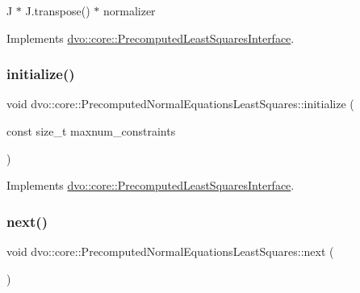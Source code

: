 J\textquotesingle{} $\ast$ J\textquotesingle{}.transpose() $\ast$ normalizer

Implements \mbox{\hyperlink{classdvo_1_1core_1_1_precomputed_least_squares_interface_a9b879b6600b82a8b989770bf27dad7bc}{dvo\+::core\+::\+Precomputed\+Least\+Squares\+Interface}}.

\mbox{\label{classdvo_1_1core_1_1_precomputed_normal_equations_least_squares_a51e5717e0add36b37db3617d35c87c87}} 
\subsubsection{\texorpdfstring{initialize()}{initialize()}}
{\footnotesize\ttfamily void dvo\+::core\+::\+Precomputed\+Normal\+Equations\+Least\+Squares\+::initialize (\begin{DoxyParamCaption}\item[{const size\+\_\+t}]{maxnum\+\_\+constraints }\end{DoxyParamCaption})\hspace{0.3cm}{\ttfamily [virtual]}}



Implements \mbox{\hyperlink{classdvo_1_1core_1_1_precomputed_least_squares_interface_abfd7276b663ea0afda8358a2ec9c96fe}{dvo\+::core\+::\+Precomputed\+Least\+Squares\+Interface}}.

\mbox{\label{classdvo_1_1core_1_1_precomputed_normal_equations_least_squares_a514bd37f6bbfeb8cb1788e6fdabc0e32}} 
\subsubsection{\texorpdfstring{next()}{next()}}
{\footnotesize\ttfamily void dvo\+::core\+::\+Precomputed\+Normal\+Equations\+Least\+Squares\+::next (\begin{DoxyParamCaption}{ }\end{DoxyParamCaption})\hspace{0.3cm}{\ttfamily [virtual]}}



